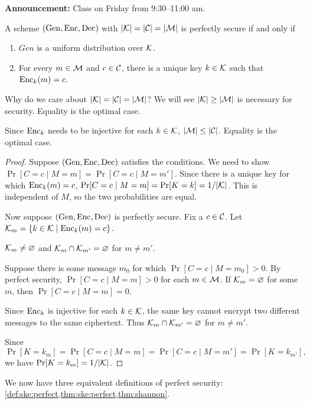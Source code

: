 \textbf{Announcement:} Class on Friday from 9:30--11:00 am.

\begin{theorem*} \label{thm:shannon}
    A scheme $(\operatorname{Gen}, \operatorname{Enc}, \operatorname{Dec})$ with
    $\lvert\mathcal{K}\rvert = \lvert\mathcal{C}\rvert = \lvert\mathcal{M}\rvert$ is perfectly secure
    if and only if
    \begin{enumerate}
        \item $Gen$ is a uniform distribution over $\mathcal{K}$.
        \item For every $m \in \mathcal{M}$ and $c \in \mathcal{C}$,
            there is a unique key $k \in \mathcal{K}$ such that
            $\operatorname{Enc}_k(m) = c$.
    \end{enumerate}
\end{theorem*}
Why do we care about $\lvert\mathcal{K}\rvert = \lvert\mathcal{C}\rvert = \lvert\mathcal{M}\rvert$?
We will see $\lvert\mathcal{K}\rvert \ge \lvert\mathcal{M}\rvert$ is necessary for security.
Equality is the optimal case.

Since $\operatorname{Enc}_k$ needs to be injective for each $k \in \mathcal{K}$,
$\lvert\mathcal{M}\rvert \le \lvert\mathcal{C}\rvert$.
Equality is the optimal case.

\begin{proof}
    Suppose $(\operatorname{Gen}, \operatorname{Enc}, \operatorname{Dec})$ satisfies the conditions.
    We need to show $\Pr[C = c \mid M = m] = \Pr[C = c \mid M = m']$.
    Since there is a unique key for which $\operatorname{Enc}_k(m) = c$,
    $\Pr[C = c \mid M = m] = \Pr[K = k] = 1/\lvert\mathcal{K}\rvert$.
    This is independent of $M$, so the two probabilities are equal.

    Now suppose $(\operatorname{Gen}, \operatorname{Enc}, \operatorname{Dec})$ is perfectly secure.
    Fix a $c \in \mathcal{C}$.
    Let $\mathcal{K}_m = \{k \in \mathcal{K} \mid \operatorname{Enc}_k(m) = c\}$.

    \begin{claim}
        $\mathcal{K}_m \ne \varnothing$ and $\mathcal{K}_m \cap \mathcal{K}_{m'} = \varnothing$ for $m \ne m'$.
    \end{claim}
    Suppose there is some message $m_0$ for which
    $\Pr[C = c \mid M = m_0] > 0$.
    By perfect security, $\Pr[C = c \mid M = m] > 0$ for each $m \in \mathcal{M}$.
    If $\mathcal{K}_m = \varnothing$ for some $m$, then $\Pr[C = c \mid M = m] = 0$.

    Since $\operatorname{Enc}_k$ is injective for each $k \in \mathcal{K}$,
    the same key cannot encrypt two different messages to the same
    ciphertext.
    Thus $\mathcal{K}_m \cap \mathcal{K}_{m'} = \varnothing$ for $m \ne m'$.

    Since \[
        \Pr[K = k_m] = \Pr[C = c \mid M = m] = \Pr[C = c \mid M = m']
        = \Pr[K = k_{m'}],
    \] we have $\Pr[K = k_m] = 1/\lvert\mathcal{K}\rvert$.
\end{proof}

We now have three equivalent definitions of perfect security:
\cref{def:ske:perfect,thm:ske:perfect,thm:shannon}.
